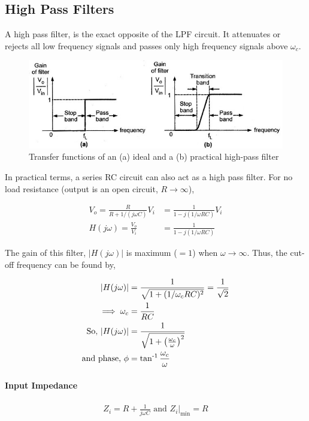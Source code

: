 \subsection{High Pass Filters}

A high pass filter, is the exact opposite of the LPF circuit. It attenuates or rejects all low frequency signals and passes only high frequency signals above $\omega_c$.

\begin{figure}[H]
    \centering
    \includegraphics[width=1\columnwidth]{images/f6.jpg}
    \caption{Transfer functions of an (a) ideal and a (b) practical high-pass filter}
    \label{fig:3}
\end{figure}

In practical terms, a series RC circuit can also act as a high pass filter. For no load resistance (output is an open circuit, $R \rightarrow \infty$),

\begin{align}
    V_o = \frac{R}{R+1/(j\omega C)}V_i &= \frac{1}{1-j(1/\omega RC)}V_i\\
    H(j\omega) = \frac{V_o}{V_i} &= \frac{1}{1-j(1/\omega RC)}
\end{align}

The gain of this filter, $|H(j\omega)|$ is maximum ($=1$) when $\omega \rightarrow \infty$. Thus, the cut-off frequency can be found by,

\begin{align}
    |H(j\omega)| &= \frac{1}{\sqrt{1+(1/\omega_c RC)^2}} = \frac{1}{\sqrt{2}}\\
    \implies \omega_c &= \frac{1}{RC}\\
    \text{So, } |H(j\omega)| &=  \frac{1}{\sqrt{1+\left(\frac{\omega_c}{\omega}\right)^2}} \\
    \text{and phase, } \phi &= \operatorname{tan^{-1}}{\frac{\omega_c}{\omega}}
\end{align}

\paragraph*{\textbf{Input Impedance}}
\begin{align*}
    Z_i = R+\frac{1}{j\omega C} \text{ and } Z_i\big|_\text{min} = R
\end{align*}

